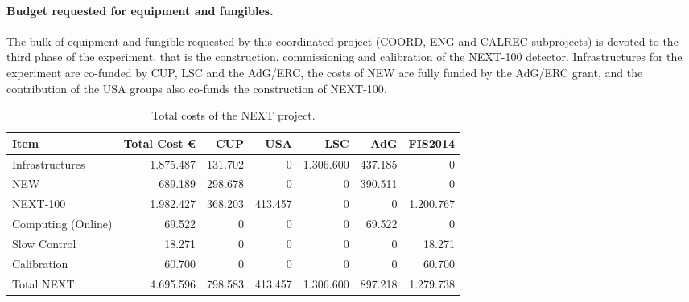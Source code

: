 \paragraph{Budget requested for equipment and fungibles.}

The bulk of equipment and fungible requested by this coordinated project (COORD, ENG and CALREC subprojects) is devoted to the third phase of the experiment, that is the construction, commissioning and calibration of the NEXT-100 detector. 
 Infrastructures for the experiment are co-funded by CUP, LSC and the AdG/ERC, the costs of NEW are fully funded by the AdG/ERC grant, and the contribution of the USA groups also co-funds the construction of NEXT-100. 

\begin{table}[h!]
\begin{center}
\begin{tabular}{|l|r|r|r|r|r|r|}
\hline
 Item              & Total Cost \euro & CUP	&USA &	LSC & AdG &	FIS2014 \\
 \hline
Infrastructures    & 1.875.487 & 131.702 & 	 0 & 1.306.600 & 437.185 &	   0 \\
NEW                &   689.189 & 298.678 & 	 0 &	     0 & 390.511 &	   0 \\	
NEXT-100           & 1.982.427 & 368.203 & 413.457 &	     0 &       0 & 1.200.767 \\
Computing (Online) &    69.522 &       0 & 	 0 &	     0 &  69.522 &	   0 \\
Slow Control       &    18.271 &       0 &	 0 &	     0 &       0 &    18.271 \\
Calibration        &	60.700 &       0 &	 0 &	     0 &       0 &    60.700 \\
 \hline
Total  NEXT        & 4.695.596 & 798.583 & 413.457 & 1.306.600 & 897.218 & 1.279.738 \\
 \hline
\end{tabular}  
\caption{Total costs of the NEXT project.}
\label{tab.TCOSTS}
\end{center}
\end{table} 

